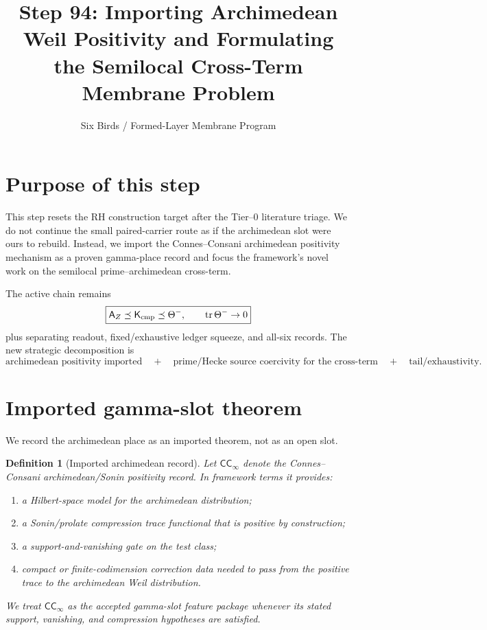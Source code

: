 \documentclass[11pt]{article}
\title{Step 94: Importing Archimedean Weil Positivity and Formulating the Semilocal Cross-Term Membrane Problem}
\author{Six Birds / Formed-Layer Membrane Program}
\date{}
\newtheorem{definition}{Definition}
\newcommand{\Kcmp}{\mathsf K_{\rm cmp}}
\newcommand{\AZ}{\mathsf A_Z}
\newcommand{\CC}{\mathsf{CC}_\infty}
\begin{document}
\maketitle

\section{Purpose of this step}
This step resets the RH construction target after the Tier--0 literature triage.  We do not continue the small paired-carrier route as if the archimedean slot were ours to rebuild.  Instead, we import the Connes--Consani archimedean positivity mechanism as a proven gamma-place record and focus the framework's novel work on the semilocal prime--archimedean cross-term.

The active chain remains
\[
\boxed{
\AZ \preceq \Kcmp \preceq \Theta^-,\qquad \operatorname{tr}\Theta^-\to0
}
\]
plus separating readout, fixed/exhaustive ledger squeeze, and all-six records.  The new strategic decomposition is
\[
\boxed{
\text{archimedean positivity imported}
\quad +\quad
\text{prime/Hecke source coercivity for the cross-term}
\quad +\quad
\text{tail/exhaustivity}
.}
\]

\section{Imported gamma-slot theorem}
We record the archimedean place as an imported theorem, not as an open slot.

\begin{definition}[Imported archimedean record]
Let \(\CC\) denote the Connes--Consani archimedean/Sonin positivity record.  In framework terms it provides:
\begin{enumerate}[label=(\roman*)]
\item a Hilbert-space model for the archimedean distribution;
\item a Sonin/prolate compression trace functional that is positive by construction;
\item a support-and-vanishing gate on the test class;
\item compact or finite-codimension correction data needed to pass from the positive trace to the archimedean Weil distribution.
\end{enumerate}
We treat \(\CC\) as the accepted gamma-slot feature package whenever its stated support, vanishing, and compression hypotheses are satisfied.
\end{definition}
\end{document}
